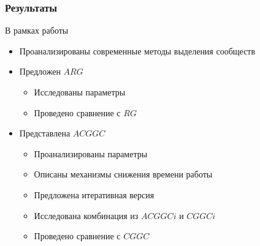 

\begin{frame}
	\frametitle{Результаты}

	В рамках работы
	\begin{itemize}
		\item Проанализированы современные методы выделения сообществ
		\item Предложен $ARG$
		\begin{itemize}
			\item Исследованы параметры
			\item Проведено сравнение с $RG$
		\end{itemize}
		\item Представлена $ACGGC$
		\begin{itemize}
			\item Проанализированы параметры
			\item Описаны механизмы снижения времени работы
			\item Предложена итеративная версия
			\item Исследована комбинация из $ACGGCi$ и $CGGCi$	
			\item Проведено сравнение с $CGGC$
		\end{itemize}
	\end{itemize}
\end{frame}